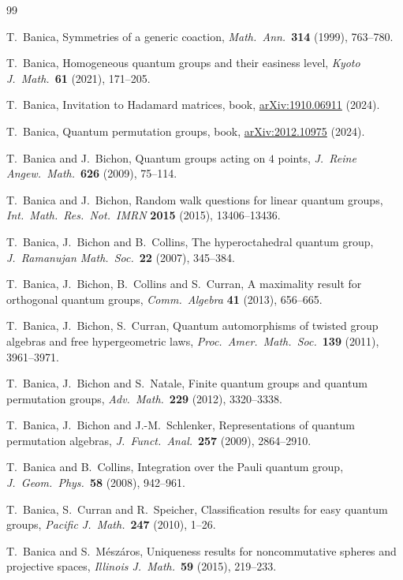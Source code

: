 \documentclass[11pt]{amsart}
\theoremstyle{definition}
\theoremstyle{remark}
\theoremstyle{plain}
\numberwithin{equation}{section}
\numberwithin{table}{section}
\begin{document}
\begin{thebibliography}{99}
\raggedright
\hypersetup{urlcolor=black}

 T.~Banica, Symmetries of a generic coaction, \emph{Math.\ Ann.}\ \textbf{314} (1999), 763--780.

 T.~Banica, Homogeneous quantum groups and their easiness level, \emph{Kyoto J.\ Math.}\ \textbf{61} (2021), 171--205.

 T.~Banica, Invitation to Hadamard matrices, book, \href{https://arxiv.org/pdf/1910.06911}{arXiv:1910.06911} (2024).

 T.~Banica, Quantum permutation groups, book, \href{https://arxiv.org/pdf/2012.10975}{arXiv:2012.10975} (2024).

 T.~Banica and J.~Bichon, Quantum groups acting on $4$ points, \emph{J.\ Reine Angew.\ Math.}\ \textbf{626} (2009), 75--114.

 T.~Banica and J.~Bichon, Random walk questions for linear quantum groups, \emph{Int.\ Math.\ Res.\ Not.\ IMRN} \textbf{2015} (2015), 13406--13436.

 T.~Banica, J.~Bichon and B.~Collins, The hyperoctahedral quantum group, \emph{J.\ Ramanujan Math.\ Soc.}\ \textbf{22} (2007), 345--384.

 T.~Banica, J.~Bichon, B.~Collins and S.~Curran, A maximality result for orthogonal quantum groups, \emph{Comm.\ Algebra} \textbf{41} (2013), 656--665.

 T.~Banica, J.~Bichon, S.~Curran, Quantum automorphisms of twisted group algebras and free hypergeometric laws, \emph{Proc.\ Amer.\ Math.\ Soc.}\ \textbf{139} (2011), 3961--3971.

 T.~Banica, J.~Bichon and S.~Natale, Finite quantum groups and quantum permutation groups, \emph{Adv.\ Math.}\ \textbf{229} (2012), 3320--3338.

 T.~Banica, J.~Bichon and J.-M.~Schlenker, Representations of quantum permutation algebras, \emph{J.\ Funct.\ Anal.}\ \textbf{257} (2009), 2864--2910.

 T.~Banica and B.~Collins, Integration over the Pauli quantum group, \emph{J.\ Geom.\ Phys.}\ \textbf{58} (2008), 942--961.

 T.~Banica, S.~Curran and R.~Speicher, Classification results for easy quantum groups, \emph{Pacific J.\ Math.}\ \textbf{247} (2010), 1--26.

 T.~Banica and S.~M\'esz\'aros, Uniqueness results for noncommutative spheres and projective spaces, \emph{Illinois J.\ Math.}\ \textbf{59} (2015), 219--233.


\end{thebibliography}
\end{document}

